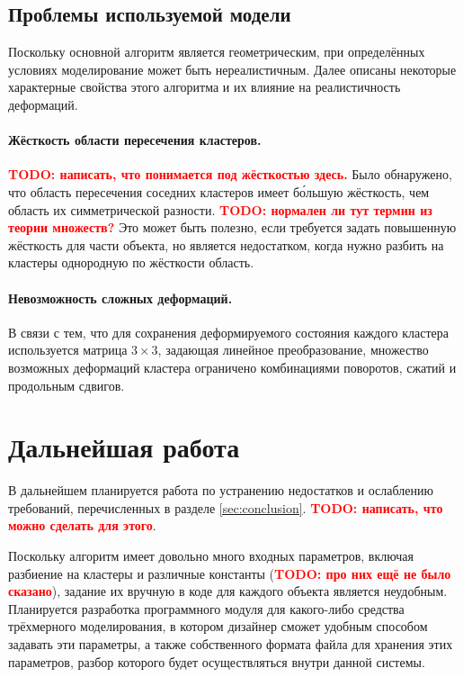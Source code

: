 \documentclass[a4paper, 14pt, titlepage]{extarticle}
\newcommand{\todo}[1]{\textbf{\textcolor{red}{TODO: #1}}}
\let\oldsection\section
\renewcommand{\section}{\newpage\oldsection}
\begin{document}
    \subsection{Проблемы используемой модели}

        Поскольку основной алгоритм является геометрическим, при определённых условиях моделирование
        может быть нереалистичным. Далее описаны некоторые характерные свойства этого алгоритма и их
        влияние на реалистичность деформаций.

        \paragraph{Жёсткость области пересечения кластеров.} \todo{написать, что понимается под
        жёсткостью здесь.} Было обнаружено, что область
        пересечения соседних кластеров имеет б\'{о}льшую жёсткость, чем область их симметрической
        разности. \todo{нормален ли тут термин из теории множеств?} Это может быть полезно, если
        требуется задать повышенную жёсткость для части объекта, но является недостатком, когда
        нужно разбить на кластеры однородную по жёсткости область.

        \paragraph{Невозможность сложных деформаций.} В связи с тем, что для сохранения
        деформируемого состояния каждого кластера используется матрица $3 \times 3$, задающая
        линейное преобразование, множество возможных деформаций кластера ограничено комбинациями
        поворотов, сжатий и продольным сдвигов.

  \section{Дальнейшая работа}

    В дальнейшем планируется работа по устранению недостатков и ослаблению требований, перечисленных
    в разделе \ref{sec:conclusion}. \todo{написать, что можно сделать для этого}.

    Поскольку алгоритм имеет довольно много входных параметров, включая разбиение на кластеры и различные константы (\todo{про них ещё не было
    сказано}), задание их вручную в коде для каждого объекта является неудобным. Планируется
    разработка программного модуля для какого-либо средства трёхмерного моделирования, в котором
    дизайнер сможет удобным способом задавать эти параметры, а также собственного формата файла для
    хранения этих параметров, разбор которого будет осуществляться внутри данной системы.
\end{document}

